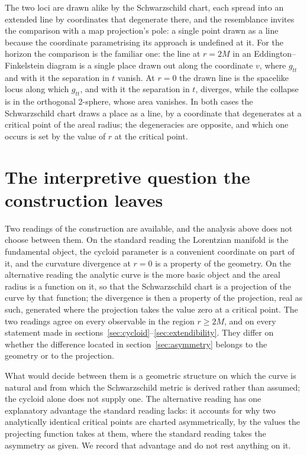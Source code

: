 \documentclass{iopjournal}
\theoremstyle{plain}
\theoremstyle{remark}
\begin{document}
The two loci are drawn alike by the Schwarzschild chart, each spread into an extended line by coordinates that degenerate there, and the resemblance invites the comparison with a map projection's pole: a single point drawn as a line because the coordinate parametrising its approach is undefined at it. For the horizon the comparison is the familiar one: the line at $r=2M$ in an Eddington--Finkelstein diagram is a single place drawn out along the coordinate $v$, where $g_{tt}$ and with it the separation in $t$ vanish. At $r=0$ the drawn line is the spacelike locus along which $g_{tt}$, and with it the separation in $t$, diverges, while the collapse is in the orthogonal 2-sphere, whose area vanishes. In both cases the Schwarzschild chart draws a place as a line, by a coordinate that degenerates at a critical point of the areal radius; the degeneracies are opposite, and which one occurs is set by the value of $r$ at the critical point.

\section{The interpretive question the construction leaves}\label{sec:reading}

Two readings of the construction are available, and the analysis above does not choose between them. On the standard reading the Lorentzian manifold is the fundamental object, the cycloid parameter is a convenient coordinate on part of it, and the curvature divergence at $r=0$ is a property of the geometry. On the alternative reading the analytic curve is the more basic object and the areal radius is a function on it, so that the Schwarzschild chart is a projection of the curve by that function; the divergence is then a property of the projection, real as such, generated where the projection takes the value zero at a critical point. The two readings agree on every observable in the region $r\geq2M$, and on every statement made in sections~\ref{sec:cycloid}--\ref{sec:extendibility}. They differ on whether the difference located in section~\ref{sec:asymmetry} belongs to the geometry or to the projection.

What would decide between them is a geometric structure on which the curve is natural and from which the Schwarzschild metric is derived rather than assumed; the cycloid alone does not supply one. The alternative reading has one explanatory advantage the standard reading lacks: it accounts for why two analytically identical critical points are charted asymmetrically, by the values the projecting function takes at them, where the standard reading takes the asymmetry as given. We record that advantage and do not rest anything on it.
\end{document}

